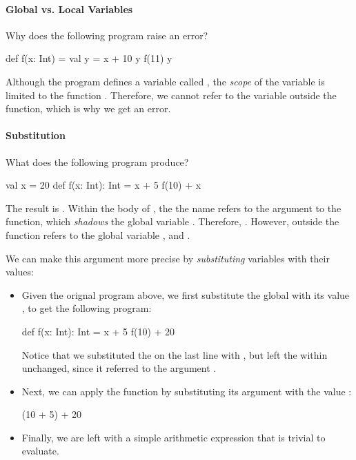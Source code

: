 \documentclass[9pt]{extbook}
\begin{document}
\paragraph{Global vs. Local Variables}

Why does the following program raise an error?

%
\begin{scalacode}
def f(x: Int) = {
  val y = x + 10
  y
}
f(11)
y
\end{scalacode}

Although the program defines a variable called , the
\emph{scope} of the variable is limited to the function .
Therefore, we cannot refer to the variable outside the function, which
is why we get an error.

\paragraph{Substitution}

What does the following program produce?
%
\begin{scalacode}
val x = 20
def f(x: Int): Int = {
  x + 5
}
f(10) + x
\end{scalacode}

The result is . Within the body of , the
the name  refers to the argument to the function, which
\emph{shadows} the global variable . Therefore,
. However, outside the function 
refers to the global variable , and
.

We can make this argument more precise by \emph{substituting} variables
with their values:

\begin{itemize}

\item Given the orignal program above, we first substitute
the global  with its value , to get
the following program:
\begin{scalacode}
def f(x: Int): Int = {
  x + 5
}
f(10) + 20
\end{scalacode}
%
Notice that we substituted the  on the last line with ,
but left the  within  unchanged, since it referred
to the argument .

\item Next, we can apply the function  by substituting
its argument  with the value :
%
\begin{scalacode}
(10 + 5) + 20
\end{scalacode}

\item Finally, we are left with a simple arithmetic expression that is
trivial to evaluate.

\end{itemize}
\end{document}

